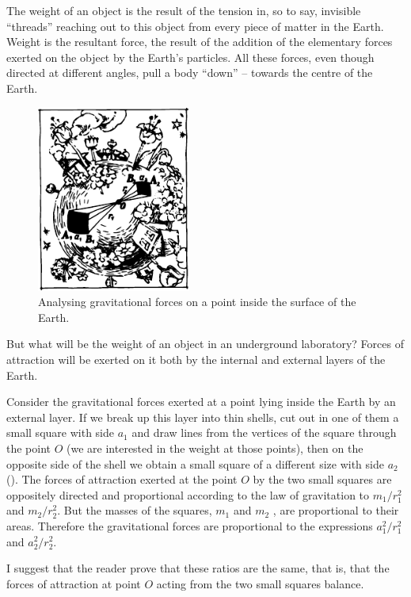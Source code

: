 The weight of an object is the result of the tension in,
so to say, invisible ``threads'' reaching out to this object
from every piece of matter in the Earth. Weight is the
resultant force, the result of the addition of the elementary forces exerted on the object by the Earth's particles.
All these forces, even though directed at different angles,
pull a body ``down'' -- towards the centre of the Earth.
 \begin{figure}[!ht]
 \centering
 \includegraphics[width=0.45\textwidth]{figures/fig-6-4.pdf}
 \caption{Analysing gravitational forces on a point inside the surface of the Earth.}
 \label{fig-6-4}
 \end{figure}
But what will be the weight of an object in an underground laboratory? Forces of attraction will be exerted
on it both by the internal and external layers of the
Earth.

Consider the gravitational forces exerted at a point
lying inside the Earth by an external layer. If we break
up this layer into thin shells, cut out in one of them a
small square with side $a_{1}$ and draw lines from the vertices
of the square through the point $O$ (we are interested in
the weight at those points), then on the opposite side
of the shell we obtain a small square of a different size
with side $a_{2}$ (). The forces of attraction exerted
at the point $O$ by the two small squares are oppositely
directed and proportional according to the law of gravitation to $m_{1}/r_{1}^{2}$ and $m_{2}/r_{2}^{2}$. But the masses of the squares,
$m_{1}$ and $m_{2}$ , are proportional to their areas. Therefore the gravitational forces are proportional to the expressions $a_{1}^{2}/r_{1}^{2}$ and $a_{2}^{2}/r_{2}^{2}$.

I suggest that the reader prove that these ratios are the
same, that is, that the forces of attraction at point $O$
acting from the two small squares balance.

